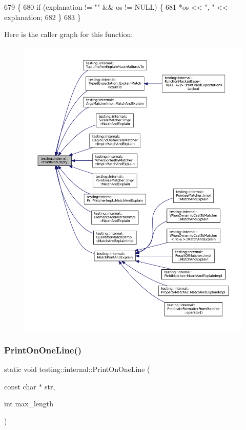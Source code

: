 \begin{DoxyCode}
679                                             \{
680   \textcolor{keywordflow}{if} (explanation != \textcolor{stringliteral}{""} && os != NULL) \{
681     *os << \textcolor{stringliteral}{", "} << explanation;
682   \}
683 \}
\end{DoxyCode}
Here is the caller graph for this function\+:
\nopagebreak
\begin{figure}[H]
\begin{center}
\leavevmode
\includegraphics[width=350pt]{namespacetesting_1_1internal_afa4cd5d7933878d6d820b32c87bb2767_icgraph}
\end{center}
\end{figure}
\mbox{\label{namespacetesting_1_1internal_a4a8708bfb808411f9d918c7356ae7362}} 
\subsubsection{\texorpdfstring{Print\+On\+One\+Line()}{PrintOnOneLine()}}
{\footnotesize\ttfamily static void testing\+::internal\+::\+Print\+On\+One\+Line (\begin{DoxyParamCaption}\item[{const char $\ast$}]{str,  }\item[{int}]{max\+\_\+length }\end{DoxyParamCaption})\hspace{0.3cm}{\ttfamily [static]}}




